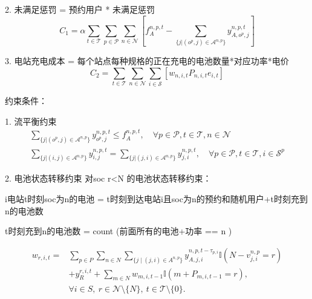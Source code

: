 \documentclass[12pt,hyperref,a4paper,UTF8]{ctexart}
\begin{document}

2. 未满足惩罚 = 预约用户 * 未满足惩罚
\begin{equation}
C_1 = \alpha \sum_{t\in \mathcal{T}} \sum_{p\in \mathcal{P}}  \sum_{n\in \mathcal{N}} 
\left[
f^{n,p,t}_A - \sum_{\{j | (o^p,j) \in \mathcal{A}^{n,p}\}} y^{n,p,t}_{A,o^p,j} \right]
\label{eq:penaltycost}
\end{equation}

3. 电站充电成本 = 每个站点每种规格的正在充电的电池数量*对应功率*电价
\begin{equation}
C_2 = \sum_{t \in \mathcal{T}}  \sum_{n \in \mathcal{N}} \sum_{i \in \mathcal{S}}
\left[
w_{n,i,t}P_{n,i,t}e_{i,t}
\right]
\end{equation}

约束条件：

1. 流平衡约束
\begin{subequations}
\label{eq:flow}
\begin{gather}
\sum_{\{j| (o^p,j)\in \mathcal{A}^{n,p}\}}{y^{n,p,t}_{o^p,j}} \leq f^{n,p,t}_A,\quad \forall{p\in \mathcal{P},t\in \mathcal{T}},n \in \mathcal{N}\label{eq:flow1}\\
\sum_{\{j| (i,j)\in \mathcal{A}^{n,p}\}}{y^{n,p,t}_{i,j}} =\sum_{\{j| (j,i)\in \mathcal{A}^{n,p}\}}{y^{n,p,t}_{j,i}},\quad \forall{p\in \mathcal{P},t\in \mathcal{T},i\in \mathcal{S}^p}\label{eq:flow2}
\end{gather}
\end{subequations}

2. 电池状态转移约束
对soc r<N 的电池状态转移约束：

i电站t时刻soc为n的电池 = t时刻到达电站i且soc为n的预约和随机用户+t时刻充到n的电池数

t时刻充到n的电池数 = count (前面所有的电池+功率 == n )


\begin{equation}
\begin{aligned}
w_{r,i,t}
=&
\sum_{p\in P}
\sum_{n\in N}
\sum_{\{j\mid (j,i)\in A^{n,p}\}}
y^{n,p,t-\tau_{p,i}}_{A,j,i}
\mathbb{I}\!\left(N-v^{n,p}_{j,i}=r\right)
\\
&+
y^{r,i,t}_{R}
+
\sum_{m\in N}
w_{m,i,t-1}
\mathbb{I}\!\left(m+P_{m,i,t-1}=r\right),
\\
&\forall i\in S,\ r\in \mathcal{N}\setminus\{N\},\ t\in \mathcal{T}\setminus\{0\}.
\end{aligned}
\tag{7a}
\end{equation}
\end{document}
